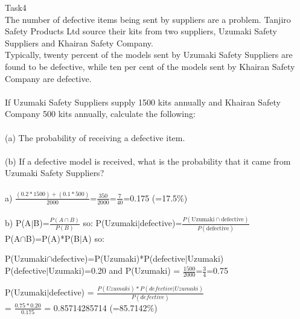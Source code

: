 \documentclass[12pt]{article}
\begin{document}
Task4\\
The number of defective items being sent by suppliers are a
problem. Tanjiro Safety Products Ltd source their kits from two
suppliers, Uzumaki Safety Suppliers and Khairan Safety
Company.\\
Typically, twenty percent of the models sent by Uzumaki
Safety Suppliers are found to be defective, while ten per cent
of the models sent by Khairan Safety Company are defective.\\\\
If Uzumaki Safety Suppliers supply 1500 kits annually and
Khairan Safety Company 500 kits annually, calculate the
following:\\\\
(a) The probability of receiving a defective item.\\\\
(b) If a defective model is received, what is the probability
that it came from Uzumaki Safety Suppliers?
\\\\
a) $\frac{(0.2*1500)+(0.1*500)}{2000}$=$\frac{350}{2000}$=$\frac{7}{40}$=0.175 (=17.5\%)\\\\
b) P(A$\vert$B)=$\frac{P(A\cap B)}{P(B)}$ so:
P(Uzumaki$\vert$defective)=$\frac{P(\text{Uzumaki}\cap\text{defective})}{P(\text{defective})}$\\

P(A$\cap$B)=P(A)*P(B$\vert$A) so: 

P(Uzumaki$\cap$defective)=P(Uzumaki)*P(defective$\vert$Uzumaki)\\

P(defective$\vert$Uzumaki)=0.20 and P(Uzumaki) = $\frac{1500}{2000}$=$\frac{3}{4}$=0.75

P(Uzumaki$\vert$defective) = $\frac{P(Uzumaki)*P(defective\vert Uzumaki)}{P(defective)}$\\

= $\frac{0.75*0.20}{0.175}$ = 0.85714285714  (=85.7142\%)
\end{document}
